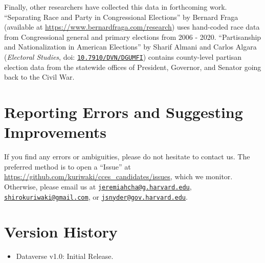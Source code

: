 \documentclass[12pt]{article}
\begin{document}


Finally, other researchers have collected this data in forthcoming work. ``Separating Race and Party in Congressional
Elections'' by Bernard Fraga (available at \url{https://www.bernardfraga.com/research}) uses hand-coded race data from Congressional general and primary elections from 2006 - 2020. ``Partisanship and Nationalization in American Elections'' by Sharif Almani and Carlos Algara (\emph{Electoral Studies}, doi: \href{https://doi.org/10.7910/DVN/DGUMFI}{\texttt{10.7910/DVN/DGUMFI}}) contains county-level partisan election data from the statewide offices of President, Governor, and Senator going back to the Civil War. 

\section{Reporting Errors and Suggesting Improvements}

If you find any errors or ambiguities, please do not hesitate to contact us. The preferred method is to open a ``Issue'' at \url{https://github.com/kuriwaki/cces_candidates/issues}, which we monitor. Otherwise, please email us at \href{mailto:jeremiahcha@g.harvard.edu}{\texttt{jeremiahcha@g.harvard.edu}}, \href{mailto:shirokuriwaki@gmail.com}{\texttt{shirokuriwaki@gmail.com}}, or \href{mailto:jsnyder@gov.harvard.edu}{\texttt{jsnyder@gov.harvard.edu}}.



\section{Version History}

\begin{itemize}
\item Dataverse v1.0: Initial Release.
\end{itemize}	


	
\end{document}

